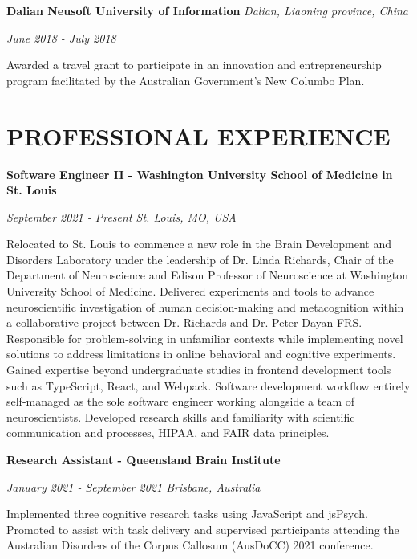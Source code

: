 \documentclass{article}
\begin{document}
  \medbreak

  \textbf{Dalian Neusoft University of Information} \hfill \textit{Dalian, Liaoning province, China}

  \textit{June 2018 - July 2018}

  Awarded a travel grant to participate in an innovation and entrepreneurship program facilitated by the Australian Government's New Columbo Plan.

  \section*{\centering\uppercase{Professional Experience}}

  {\large\textbf{Software Engineer II - Washington University School of Medicine in St. Louis}}

  \textit{September 2021 - Present \hfill St. Louis, MO, USA}

  Relocated to St. Louis to commence a new role in the Brain Development and Disorders Laboratory under the leadership of Dr. Linda Richards, Chair of the Department of Neuroscience and Edison Professor of Neuroscience at Washington University School of Medicine. Delivered experiments and tools to advance neuroscientific investigation of human decision-making and metacognition within a collaborative project between Dr. Richards and Dr. Peter Dayan FRS. Responsible for problem-solving in unfamiliar contexts while implementing novel solutions to address limitations in online behavioral and cognitive experiments. Gained expertise beyond undergraduate studies in frontend development tools such as TypeScript, React, and Webpack. Software development workflow entirely self-managed as the sole software engineer working alongside a team of neuroscientists. Developed research skills and familiarity with scientific communication and processes, HIPAA, and FAIR data principles.

  \medbreak

  {\large\textbf{Research Assistant - Queensland Brain Institute}}

  \textit{January 2021 - September 2021 \hfill Brisbane, Australia}

  Implemented three cognitive research tasks using JavaScript and jsPsych. Promoted to assist with task delivery and supervised participants attending the Australian Disorders of the Corpus Callosum (AusDoCC) 2021 conference.
\end{document}
